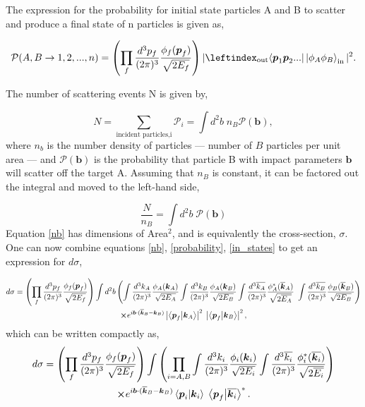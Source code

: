 \documentclass[a4paper,11pt]{article}
\begin{document}
The expression for the probability for initial state particles A and B to scatter and produce a final state of n particles is given as, 

\begin{equation}\label{probability}
	\mathcal{P}(A,B \rightarrow 1, 2, ..., n)= \left(\prod_{f} \frac{d^3p_f}{(2\pi)^3} \frac{\phi_f(\boldsymbol{p}_f)}{\sqrt{2E_f}}\right)  |\leftindex_{\text{out}}{\bra{\boldsymbol{p}_1 \boldsymbol{p}_2 ...}}\ket{\phi_A\phi_B}_\text{in}|^2.
\end{equation}				


The number of scattering events N is given by,

$$N = \sum_{\text{incident particles,i}} \mathcal{P}_i = \int d^2b\; n_B \mathcal{P}(\boldsymbol{b}),$$
where  $n_b$ is the number density of particles --- number of $B$ particles per unit area --- and $\mathcal{P}(\boldsymbol{b})$ is the probability that particle B with impact parameters $\boldsymbol{b}$ will scatter off the target A. Assuming that $n_B$ is constant, it can be factored out the integral and moved to the left-hand side, 

\begin{equation}\label{nb}
	\frac{N}{n_B} =\int d^2b\; \mathcal{P}(\boldsymbol{b}) 
\end{equation}
Equation \ref{nb} has dimensions of Area$^{2}$, and is equivalently the cross-section, $\sigma.$ One can now combine equations \ref{nb}, \ref{probability}, \ref{in_states} to get an expression for $d\sigma$,

\begin{gather*}
		d\sigma = \left(\prod_{f} \frac{d^3p_f}{(2\pi)^3} \frac{\phi_f(\boldsymbol{p}_f)}{\sqrt{2E_f}}\right) 
		\int d^2b \left(  \int \frac{d^3k_A}{(2\pi)^3}\frac{\phi_A(\boldsymbol{k}_A)}{\sqrt{2E_A}} \int  \frac{d^3k_B}{(2\pi)^3}\frac{\phi_A(\boldsymbol{k}_B)}{\sqrt{2E_B}} \int \frac{d^3\overline{k_A}}{(2\pi)^3} \frac{\phi^*_A(\overline{\boldsymbol{k}}_A)}{\sqrt{2\overline{E_A}}}\			\int \frac{d^3\overline{k_B}}{(2\pi)^3}\frac{\phi_B(\overline{\boldsymbol{k}}_B)}{\sqrt{2E_B}}\right)\\ 			
		\cross e^{i\boldsymbol{b}\cdot(\overline{\boldsymbol{k}}_B - \boldsymbol{k}_B)}	\left|\bra{\boldsymbol{p}_f}\ket{\boldsymbol{k}_A}\right|^2 \; \left|\bra{\boldsymbol{p}_f}\ket{\boldsymbol{k}_B}\right|^2,
\end{gather*}
which can be written compactly as,
\begin{equation}
	\begin{gathered}\label{final}
		d\sigma = \left(\prod_{f} \frac{d^3p_f}{(2\pi)^3} \frac{\phi_f(\boldsymbol{p}_f)}{\sqrt{2E_f}}\right) 
		\int \left(\prod_{i =A,B} \int \frac{d^3k_i}{(2\pi)^3}\frac{\phi_i(\boldsymbol{k}_i)}{\sqrt{2E_i}} \int  \frac{d^3\overline{k_i}}{(2\pi)^3}\frac{\phi^*_i(\overline{\boldsymbol{k}_i})}{\sqrt{2\overline{E_i}}}\right) \\
		\cross e^{i\boldsymbol{b}\cdot(\overline{\boldsymbol{k}}_B - \boldsymbol{k}_B)} \bra{\boldsymbol{p}_i}\ket{\boldsymbol{k}_i}\; \bra{\boldsymbol{p}_f}\ket{\overline{\boldsymbol{k}_i}}^*. 
	\end{gathered}
\end{equation}
\end{document}
